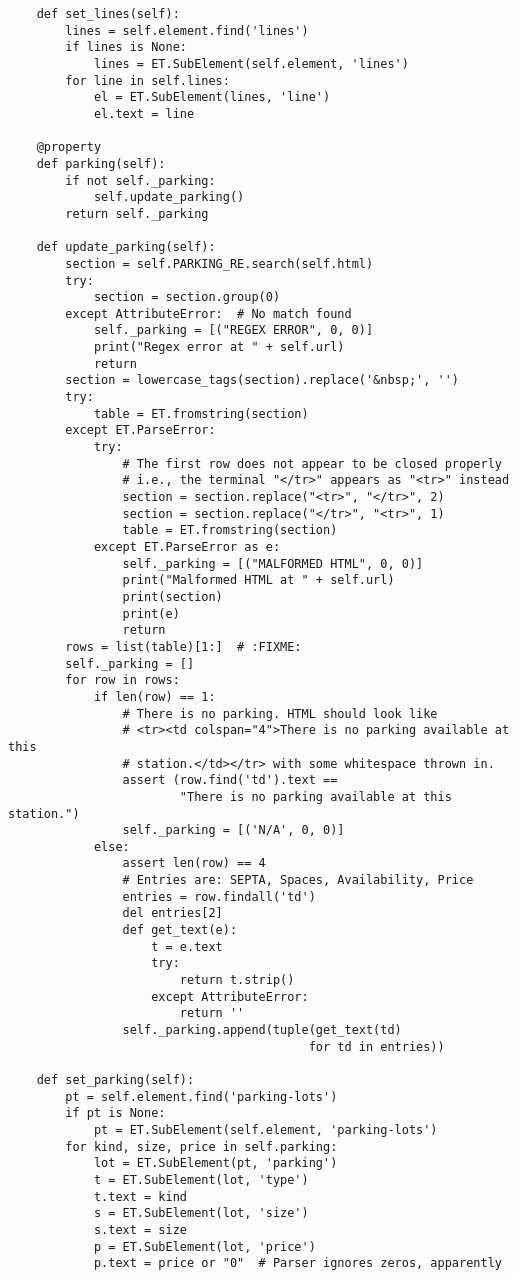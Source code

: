 \documentclass[12pt]{article}
\begin{document}
\begin{verbatim}
    def set_lines(self):
        lines = self.element.find('lines')
        if lines is None:
            lines = ET.SubElement(self.element, 'lines')
        for line in self.lines:
            el = ET.SubElement(lines, 'line')
            el.text = line

    @property
    def parking(self):
        if not self._parking:
            self.update_parking()
        return self._parking

    def update_parking(self):
        section = self.PARKING_RE.search(self.html)
        try:
            section = section.group(0)
        except AttributeError:  # No match found
            self._parking = [("REGEX ERROR", 0, 0)]
            print("Regex error at " + self.url)
            return
        section = lowercase_tags(section).replace('&nbsp;', '')
        try:
            table = ET.fromstring(section)
        except ET.ParseError:
            try:
                # The first row does not appear to be closed properly
                # i.e., the terminal "</tr>" appears as "<tr>" instead
                section = section.replace("<tr>", "</tr>", 2)
                section = section.replace("</tr>", "<tr>", 1)
                table = ET.fromstring(section)
            except ET.ParseError as e:
                self._parking = [("MALFORMED HTML", 0, 0)]
                print("Malformed HTML at " + self.url)
                print(section)
                print(e)
                return
        rows = list(table)[1:]  # :FIXME:
        self._parking = []
        for row in rows:
            if len(row) == 1:
                # There is no parking. HTML should look like
                # <tr><td colspan="4">There is no parking available at this
                # station.</td></tr> with some whitespace thrown in.
                assert (row.find('td').text ==
                        "There is no parking available at this station.")
                self._parking = [('N/A', 0, 0)]
            else:
                assert len(row) == 4
                # Entries are: SEPTA, Spaces, Availability, Price
                entries = row.findall('td')
                del entries[2]
                def get_text(e):
                    t = e.text
                    try:
                        return t.strip()
                    except AttributeError:
                        return ''
                self._parking.append(tuple(get_text(td)
                                          for td in entries))

    def set_parking(self):
        pt = self.element.find('parking-lots')
        if pt is None:
            pt = ET.SubElement(self.element, 'parking-lots')
        for kind, size, price in self.parking:
            lot = ET.SubElement(pt, 'parking')
            t = ET.SubElement(lot, 'type')
            t.text = kind
            s = ET.SubElement(lot, 'size')
            s.text = size
            p = ET.SubElement(lot, 'price')
            p.text = price or "0"  # Parser ignores zeros, apparently



\end{verbatim}
\end{document}
